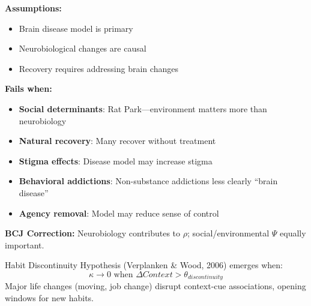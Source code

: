 \begin{tcolorbox}[colback=red!5!white, colframe=red!75!black, title=Boundary Condition: Where Addiction Neuroscience Fails]
\textbf{Assumptions:}
\begin{itemize}[nosep]
\item Brain disease model is primary
\item Neurobiological changes are causal
\item Recovery requires addressing brain changes
\end{itemize}

\textbf{Fails when:}
\begin{itemize}[nosep]
\item \textbf{Social determinants}: Rat Park---environment matters more than neurobiology
\item \textbf{Natural recovery}: Many recover without treatment
\item \textbf{Stigma effects}: Disease model may increase stigma
\item \textbf{Behavioral addictions}: Non-substance addictions less clearly ``brain disease''
\item \textbf{Agency removal}: Model may reduce sense of control
\end{itemize}

\textbf{BCJ Correction:} Neurobiology contributes to $\rho$; social/environmental $\Psi$ equally important.
\end{tcolorbox}


\begin{theorem}
\label{thm:habit-discontinuity}
Habit Discontinuity Hypothesis (Verplanken \& Wood, 2006) emerges when:
\begin{equation}
\boxed{\kappa \to 0 \text{ when } \Delta Context > \theta_{discontinuity}}
\end{equation}
Major life changes (moving, job change) disrupt context-cue associations, opening windows for new habits.
\end{theorem}

